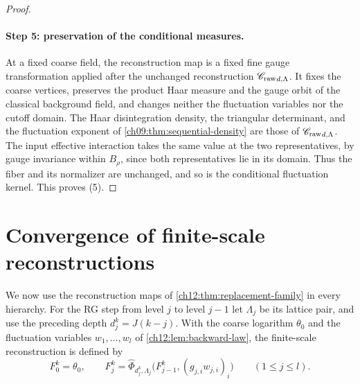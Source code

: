 \begin{proof}
\paragraph{Step 5: preservation of the conditional measures.}
At a fixed coarse field, the reconstruction map is a fixed fine gauge transformation applied after the unchanged reconstruction ${\mathscr C_{\mathrm{raw}}}_{d,\Lambda}$. It fixes the coarse vertices, preserves the product Haar measure and the gauge orbit of the classical background field, and changes neither the fluctuation variables nor the cutoff domain. The Haar disintegration density, the triangular determinant, and the fluctuation exponent of \cref{ch09:thm:sequential-density} are those of ${\mathscr C_{\mathrm{raw}}}_{d,\Lambda}$. The input effective interaction takes the same value at the two representatives, by gauge invariance within $B_\rho$, since both representatives lie in its domain. Thus the fiber and its normalizer are unchanged, and so is the conditional fluctuation kernel. This proves (5).
\end{proof}

\section{Convergence of finite-scale reconstructions}\label{ch12:sec:prefixes}

We now use the reconstruction maps of \cref{ch12:thm:replacement-family} in every hierarchy. For the RG step from level $j$ to level $j-1$ let $\Lambda_j$ be its lattice pair, and use the preceding depth $d_j^k=J(k-j)$. With the coarse logarithm $\theta_0$ and the fluctuation variables $w_1,\ldots,w_l$ of \cref{ch12:lem:backward-law}, the finite-scale reconstruction is defined by
\[
 F_0^k=\theta_0,\qquad F_j^k=\widehat\Phi_{d_j^k,\Lambda_j}\bigl(F_{j-1}^k,(g_{j,i}w_{j,i})_i\bigr)\qquad(1\le j\le l).
\]

